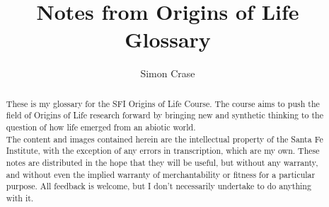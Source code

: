\documentclass[]{article}
\title{
	Notes from Origins of Life\\
	Glossary
}
\author{Simon Crase}
\begin{document}
	\maketitle

\begin{abstract}
	These is my glossary for the SFI Origins of Life Course. The course aims to push the field of Origins of Life research forward by bringing new and synthetic thinking to the question of how life emerged from an abiotic world.\\
	The content and images contained herein are the intellectual property of the Santa Fe Institute, with the exception of any errors in transcription, which are my own.
	These notes are distributed in the hope that they will be useful,
	but without any warranty, and without even the implied warranty of
	merchantability or fitness for a particular purpose. All feedback is welcome,
	but I don't necessarily undertake to do anything with it.
\end{abstract}
	
	\glsaddall
	\printglossaries
	
	
	
	
\end{document}
